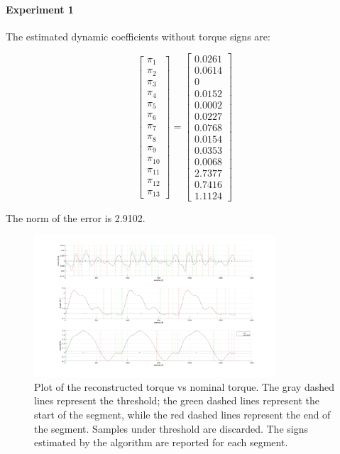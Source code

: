 \documentclass{article}
\begin{document}
\paragraph{Experiment 1} The estimated dynamic coefficients without torque signs are:

\[\begin{bmatrix}
\pi_1 \\ \pi_2 \\ \pi_3 \\ \pi_4 \\ \pi_5 \\ \pi_6 \\ \pi_7 \\ \pi_8 \\  \pi_9 \\ \pi_{10} \\ \pi_{11} \\ \pi_{12} \\ \pi_{13}
\end{bmatrix}=\begin{bmatrix}
0.0261 \\ 0.0614 \\ 0 \\ 0.0152 \\ 0.0002 \\ 0.0227 \\ 0.0768 \\ 0.0154 \\ 0.0353 \\ 0.0068 \\ 2.7377 \\ 0.7416 \\ 1.1124
\end{bmatrix}\]

The norm of the error is 2.9102.

\begin{figure}[!htbp]
\centering
\includegraphics[width=0.8\textwidth]{images/3-dof/results_experiment1.png}
\caption{Plot of the reconstructed torque vs nominal torque. The gray dashed lines represent the threshold; the green dashed lines represent the start of the segment, while the red dashed lines represent the end of the segment. Samples under threshold are discarded. The signs estimated by the algorithm are reported for each segment.}
\end{figure}
\FloatBarrier
\end{document}

